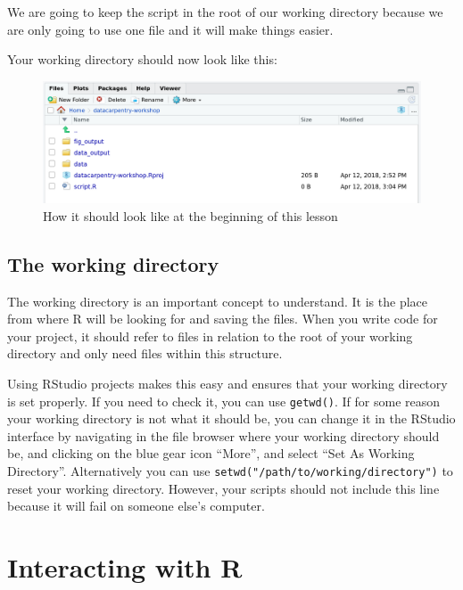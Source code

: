 \documentclass[]{book}
\begin{document}
We are going to keep the script in the root of our working directory
because we are only going to use one file and it will make things
easier.

Your working directory should now look like this:

\begin{figure}

{\centering \includegraphics[width=1\linewidth]{img/r-starting-how-it-should-look-like} 

}

\caption{How it should look like at the beginning of this lesson}\label{fig:unnamed-chunk-3}
\end{figure}

\subsection{The working directory}\label{the-working-directory}

The working directory is an important concept to understand. It is the
place from where R will be looking for and saving the files. When you
write code for your project, it should refer to files in relation to the
root of your working directory and only need files within this
structure.

Using RStudio projects makes this easy and ensures that your working
directory is set properly. If you need to check it, you can use
\texttt{getwd()}. If for some reason your working directory is not what
it should be, you can change it in the RStudio interface by navigating
in the file browser where your working directory should be, and clicking
on the blue gear icon ``More'', and select ``Set As Working Directory''.
Alternatively you can use \texttt{setwd("/path/to/working/directory")}
to reset your working directory. However, your scripts should not
include this line because it will fail on someone else's computer.

\section{Interacting with R}\label{interacting-with-r}
\end{document}
